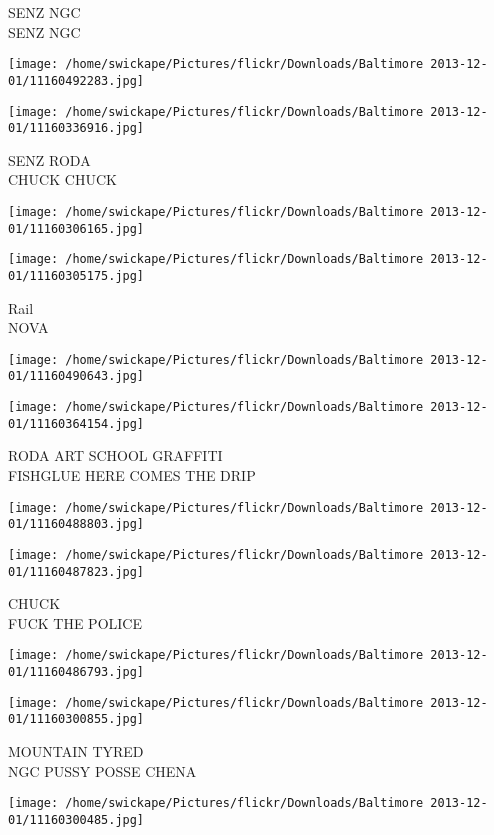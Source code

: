 \documentclass[10pt,letterpaper]{article}
\begin{document}
SENZ NGC\\
SENZ NGC
\pagebreak

\texttt{[image: /home/swickape/Pictures/flickr/Downloads/Baltimore 2013-12-01/11160492283.jpg]}

\vspace{0.25in}
\texttt{[image: /home/swickape/Pictures/flickr/Downloads/Baltimore 2013-12-01/11160336916.jpg]}

SENZ RODA\\
CHUCK CHUCK
\pagebreak

\texttt{[image: /home/swickape/Pictures/flickr/Downloads/Baltimore 2013-12-01/11160306165.jpg]}

\vspace{0.25in}
\texttt{[image: /home/swickape/Pictures/flickr/Downloads/Baltimore 2013-12-01/11160305175.jpg]}

Rail\\
NOVA
\pagebreak

\texttt{[image: /home/swickape/Pictures/flickr/Downloads/Baltimore 2013-12-01/11160490643.jpg]}

\vspace{0.25in}
\texttt{[image: /home/swickape/Pictures/flickr/Downloads/Baltimore 2013-12-01/11160364154.jpg]}

RODA ART SCHOOL GRAFFITI\\
FISHGLUE HERE COMES THE DRIP
\pagebreak

\texttt{[image: /home/swickape/Pictures/flickr/Downloads/Baltimore 2013-12-01/11160488803.jpg]}

\vspace{0.25in}
\texttt{[image: /home/swickape/Pictures/flickr/Downloads/Baltimore 2013-12-01/11160487823.jpg]}

CHUCK\\
FUCK THE POLICE
\pagebreak

\texttt{[image: /home/swickape/Pictures/flickr/Downloads/Baltimore 2013-12-01/11160486793.jpg]}

\vspace{0.25in}
\texttt{[image: /home/swickape/Pictures/flickr/Downloads/Baltimore 2013-12-01/11160300855.jpg]}

MOUNTAIN TYRED\\
NGC PUSSY POSSE CHENA
\pagebreak

\texttt{[image: /home/swickape/Pictures/flickr/Downloads/Baltimore 2013-12-01/11160300485.jpg]}
\end{document}
